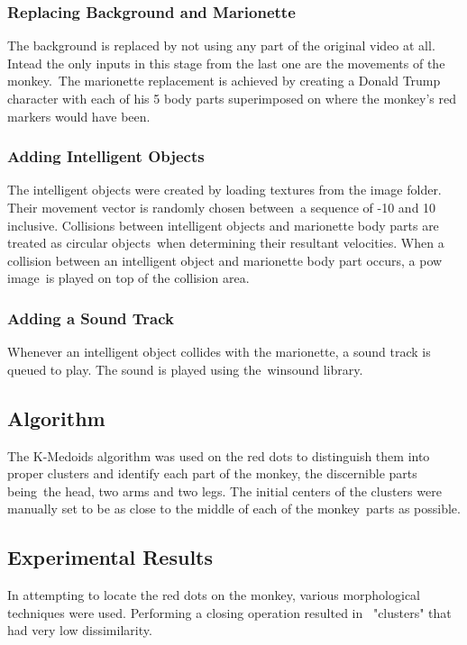 \documentclass[12pt,a4paper]{article}
\begin{document}
        \subsubsection{Replacing Background and Marionette}
        The background is replaced by not using any part of the original video at all. Intead the only inputs in this stage from the last one are the movements of the monkey.\
        The marionette replacement is achieved by creating a Donald Trump character with each of his 5 body parts superimposed on where the monkey's red markers would have been.

        \subsubsection{Adding Intelligent Objects}
        The intelligent objects were created by loading textures from the image folder. Their movement vector is randomly chosen between\
        a sequence of -10 and 10 inclusive. Collisions between intelligent objects and marionette body parts are treated as circular objects\
        when determining their resultant velocities. When a collision between an intelligent object and marionette body part occurs, a pow image\
        is played on top of the collision area.

        \subsubsection{Adding a Sound Track}
        Whenever an intelligent object collides with the marionette, a sound track is queued to play. The sound is played using the\
        winsound library.

      \subsection{Algorithm}
      The K-Medoids algorithm was used on the red dots to distinguish them into proper clusters and identify each part of the monkey, the discernible parts being\
      the head, two arms and two legs. The initial centers of the clusters were manually set to be as close to the middle of each of the monkey\
      parts as possible.

      \subsection{Experimental Results}
      In attempting to locate the red dots on the monkey, various morphological techniques were used. Performing a closing operation resulted in \
      "clusters" that had very low dissimilarity.\\
\end{document}
